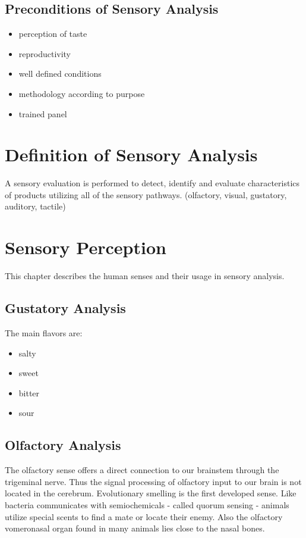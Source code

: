 \documentclass[]{scrartcl}
\begin{document}
\subsection{Preconditions of Sensory Analysis}
\begin{itemize}
    \item perception of taste
    \item reproductivity
    \item well defined conditions
    \item methodology according to purpose
    \item trained panel
  \end{itemize}

\section{Definition of Sensory Analysis}
A sensory evaluation is performed to detect, identify and evaluate
characteristics of products utilizing all of the sensory pathways.
(olfactory, visual, gustatory, auditory, tactile)


\newpage
\section{Sensory Perception}
This chapter describes the human senses and their usage in sensory analysis.
\subsection{Gustatory Analysis}
The main flavors are:
\begin{itemize}
  \item salty
  \item sweet
  \item bitter
  \item sour
\end{itemize}

\subsection{Olfactory Analysis}
The olfactory sense offers a direct connection to our brainstem through the trigeminal nerve.
Thus the signal processing of olfactory input to our brain is not located in the cerebrum.
Evolutionary smelling is the first developed sense. Like bacteria communicates with semiochemicals
- called quorum sensing - animals utilize special scents to find a mate or locate their enemy. Also the olfactory
vomeronasal organ found in many animals lies close to the nasal bones.
\end{document}
